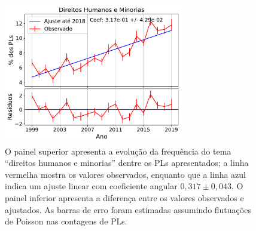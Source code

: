 \documentclass[12pt,a4paper]{article}
\begin{document}
\begin{figure}[t]
\centering
\includegraphics[width=0.7\textwidth]{graficos/PL-direitos-humanos-por-ano_2019-05-01.pdf}
\caption{O painel superior apresenta a evolução da frequência do tema ``direitos humanos e minorias''
  dentre os PLs apresentados; a linha vermelha mostra os valores observados, enquanto que a linha
  azul indica um ajuste linear com coeficiente angular $0,317\pm 0,043$. O painel inferior apresenta
  a diferença entre os valores observados e ajustados. As barras de erro foram estimadas assumindo
  flutuações de Poisson nas contagens de PLs.}
\label{fig:pl-direitos-humanos}
\end{figure}
\end{document}
